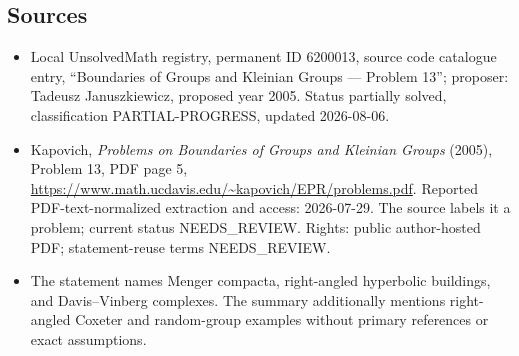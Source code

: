 \documentclass[11pt]{article}
\begin{document}
\subsection{Sources}
\begin{itemize}
\item Local UnsolvedMath registry, permanent ID 6200013, source code catalogue entry, ``Boundaries of Groups and Kleinian Groups --- Problem 13''; proposer: Tadeusz Januszkiewicz, proposed year 2005. Status partially solved, classification PARTIAL-PROGRESS, updated 2026-08-06.
\item Kapovich, \emph{Problems on Boundaries of Groups and Kleinian Groups} (2005), Problem 13, PDF page 5, \url{https://www.math.ucdavis.edu/~kapovich/EPR/problems.pdf}. Reported PDF-text-normalized extraction and access: 2026-07-29. The source labels it a problem; current status NEEDS\_REVIEW. Rights: public author-hosted PDF; statement-reuse terms NEEDS\_REVIEW.
\item The statement names Menger compacta, right-angled hyperbolic buildings, and Davis--Vinberg complexes. The summary additionally mentions right-angled Coxeter and random-group examples without primary references or exact assumptions.
\end{itemize}
\end{document}
